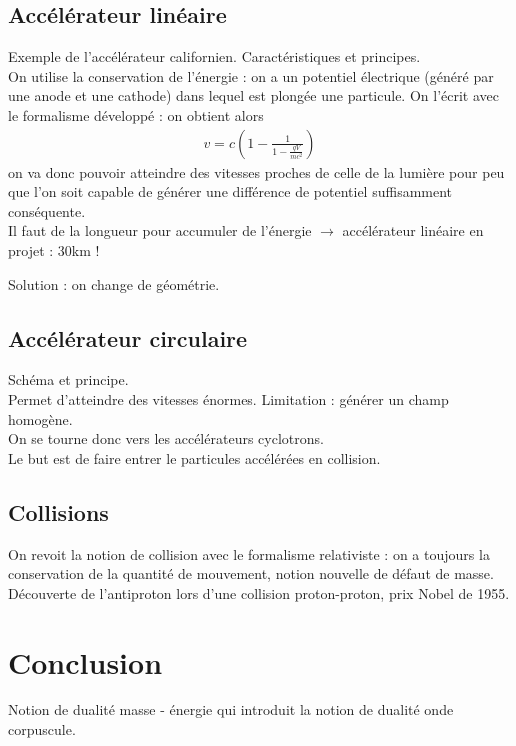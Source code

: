 \documentclass[12pt,prb,aps,epsf]{article}
\begin{document}
\subsection{Accélérateur linéaire}
Exemple de l'accélérateur californien. Caractéristiques et principes.\\

On utilise la conservation de l'énergie : on a un potentiel électrique (généré par une anode et une cathode) dans lequel est plongée une particule. On l'écrit avec le formalisme développé : on obtient alors 
\begin{eqnarray}
v = c\left(1-\frac{1}{1-\frac{qV}{mc^2}}\right)
\end{eqnarray}
on va donc pouvoir atteindre des vitesses proches de celle de la lumière pour peu que l'on soit capable de générer une différence de potentiel suffisamment conséquente.\\

Il faut de la longueur pour accumuler de l'énergie $\rightarrow$ accélérateur linéaire en projet : 30km !

Solution : on change de géométrie.

\subsection{Accélérateur circulaire}
Schéma et principe.\\
Permet d'atteindre des vitesses énormes. Limitation : générer un champ homogène.\\
On se tourne donc vers les accélérateurs cyclotrons.\\

Le but est de faire entrer le particules accélérées en collision.

\subsection{Collisions}
On revoit la notion de collision avec le formalisme relativiste : on a toujours la conservation de la quantité de mouvement, notion nouvelle de défaut de masse.\\

Découverte de l'antiproton lors d'une collision proton-proton, prix Nobel de 1955.

\section{Conclusion}
Notion de dualité masse - énergie qui introduit la notion de dualité onde corpuscule.
\end{document}
